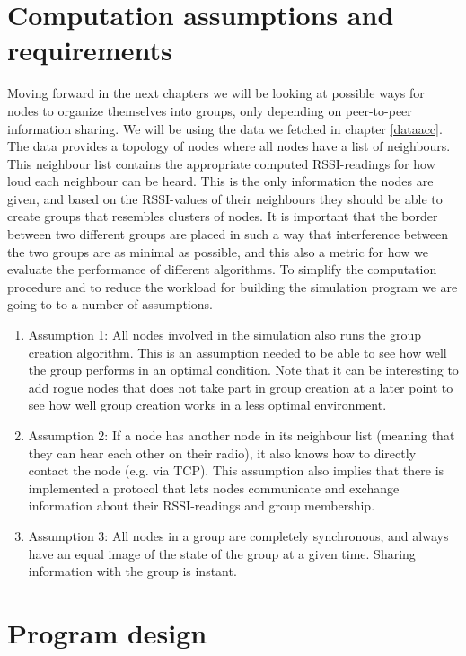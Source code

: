 \section{Computation assumptions and requirements}
Moving forward in the next chapters we will be looking at possible ways for nodes to organize themselves into groups, only depending on peer-to-peer information sharing.
We will be using the data we fetched in chapter \ref{dataacc}. The data provides a topology of nodes where all nodes have a list of neighbours.
This neighbour list contains the appropriate computed RSSI-readings for how loud each neighbour can be heard.
This is the only information the nodes are given, and based on the RSSI-values of their neighbours they should be able to create groups that resembles clusters of nodes. It is
important that the border between two different groups are placed in such a way that interference between the two groups are as minimal as possible, and this also a metric for
how we evaluate the performance of different algorithms. To simplify the computation procedure and to reduce the workload for building the simulation program
we are going to to a number of assumptions. 

    \begin{enumerate}
    \item Assumption 1: All nodes involved in the simulation also runs the group creation algorithm. This is an assumption needed to be able to
	see how well the group performs in an optimal condition. Note that it can be interesting to add rogue nodes that does not take part in group creation at a later point
	to see how well group creation works in a less optimal environment. 
    \item Assumption 2: If a node has another node in its neighbour list (meaning that they can hear each other on their radio), it also knows how to directly contact the node (e.g. via TCP).
	 This assumption also implies that there is implemented a protocol that lets nodes communicate and exchange information about their RSSI-readings and group membership. 
    \item Assumption 3: All nodes in a group are completely synchronous, and always have an equal image of the state of the group at a given time. Sharing information with the group is instant. 
    \end{enumerate}
\section{Program design}
